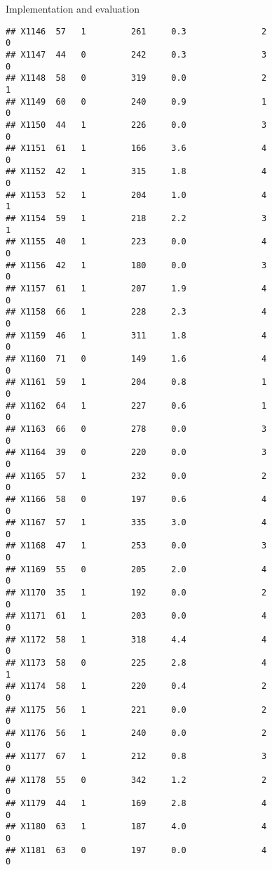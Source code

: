\documentclass[
  ignorenonframetext,
]{beamer}
\begin{document}
\begin{frame}[fragile]{Implementation and evaluation}
\begin{verbatim}
## X1146  57   1         261     0.3               2                   0
## X1147  44   0         242     0.3               3                   0
## X1148  58   0         319     0.0               2                   1
## X1149  60   0         240     0.9               1                   0
## X1150  44   1         226     0.0               3                   0
## X1151  61   1         166     3.6               4                   0
## X1152  42   1         315     1.8               4                   0
## X1153  52   1         204     1.0               4                   1
## X1154  59   1         218     2.2               3                   1
## X1155  40   1         223     0.0               4                   0
## X1156  42   1         180     0.0               3                   0
## X1157  61   1         207     1.9               4                   0
## X1158  66   1         228     2.3               4                   0
## X1159  46   1         311     1.8               4                   0
## X1160  71   0         149     1.6               4                   0
## X1161  59   1         204     0.8               1                   0
## X1162  64   1         227     0.6               1                   0
## X1163  66   0         278     0.0               3                   0
## X1164  39   0         220     0.0               3                   0
## X1165  57   1         232     0.0               2                   0
## X1166  58   0         197     0.6               4                   0
## X1167  57   1         335     3.0               4                   0
## X1168  47   1         253     0.0               3                   0
## X1169  55   0         205     2.0               4                   0
## X1170  35   1         192     0.0               2                   0
## X1171  61   1         203     0.0               4                   0
## X1172  58   1         318     4.4               4                   0
## X1173  58   0         225     2.8               4                   1
## X1174  58   1         220     0.4               2                   0
## X1175  56   1         221     0.0               2                   0
## X1176  56   1         240     0.0               2                   0
## X1177  67   1         212     0.8               3                   0
## X1178  55   0         342     1.2               2                   0
## X1179  44   1         169     2.8               4                   0
## X1180  63   1         187     4.0               4                   0
## X1181  63   0         197     0.0               4                   0

\end{verbatim}
\end{frame}
\end{document}
